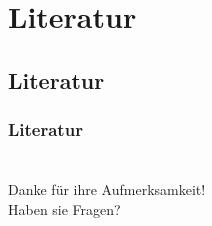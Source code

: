 \section{Literatur}
\subsection*{Literatur}
\begin{frame}[allowframebreaks]
  \frametitle{Literatur}
  \makebibliography
\end{frame}

\section*{}
{

  \begin{frame}
    \centering
    \LARGE
    Danke für ihre Aufmerksamkeit! \\[1.5cm]
    Haben sie Fragen?
  \end{frame}
}
